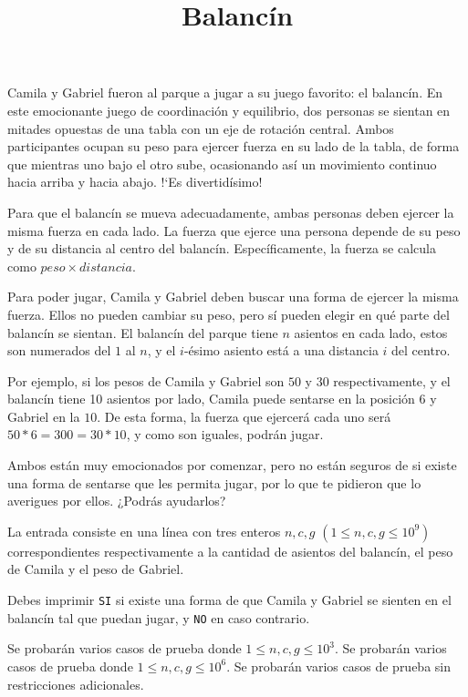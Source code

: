 \documentclass{oci}
\title{Balancín}
\begin{document}
\begin{problemDescription}
    Camila y Gabriel fueron al parque a jugar a su juego favorito: el balancín.
    En este emocionante juego de coordinación y equilibrio, dos personas se
    sientan en mitades opuestas de una tabla con un eje de rotación central.
    Ambos participantes ocupan su peso para ejercer fuerza en su lado de la tabla,
    de forma que mientras uno bajo el otro sube, ocasionando así un movimiento
    continuo hacia arriba y hacia abajo.
    !`Es divertidísimo!

    Para que el balancín se mueva adecuadamente, ambas personas deben ejercer
    la misma fuerza en cada lado.
    La fuerza que ejerce una persona depende de su peso y de su distancia
    al centro del balancín.
    Específicamente, la fuerza se calcula como $peso \times distancia$.

    Para poder jugar, Camila y Gabriel deben buscar una forma de ejercer
    la misma fuerza.
    Ellos no pueden cambiar su peso, pero sí pueden elegir en qué parte
    del balancín se sientan.
    El balancín del parque tiene $n$ asientos en cada lado,
    estos son numerados del $1$ al $n$,
    y el $i$-ésimo asiento está a una distancia $i$ del centro.

    Por ejemplo, si los pesos de Camila y Gabriel son $50$ y $30$
    respectivamente, y el balancín tiene 10 asientos por lado,
    Camila puede sentarse en la posición $6$ y Gabriel en la $10$.
    De esta forma, la fuerza que ejercerá cada uno será $50*6=300=30*10$,
    y como son iguales, podrán jugar.

    Ambos están muy emocionados por comenzar, pero no están seguros de si
    existe una forma de sentarse que les permita jugar, por lo que te pidieron
    que lo averigues por ellos. ¿Podrás ayudarlos?

\end{problemDescription}

\begin{inputDescription}
    La entrada consiste en una línea con tres enteros $n, c, g$
    $(1 \leq n, c, g \leq 10^9)$ correspondientes respectivamente
    a la cantidad de asientos del balancín, el peso de Camila
    y el peso de Gabriel.
\end{inputDescription}

\begin{outputDescription}
	Debes imprimir \texttt{SI} si existe una forma de que Camila
	y Gabriel se sienten en el balancín tal que puedan jugar,
    y \texttt{NO} en caso contrario.
\end{outputDescription}

\begin{scoreDescription}
	 Se probarán varios casos de prueba donde $1 \leq n, c, g \leq 10^3$.
	 Se probarán varios casos de prueba donde $1 \leq n, c, g \leq 10^6$.
	 Se probarán varios casos de prueba sin restricciones adicionales.
\end{scoreDescription}

\begin{sampleDescription}
\end{sampleDescription}
\end{document}
